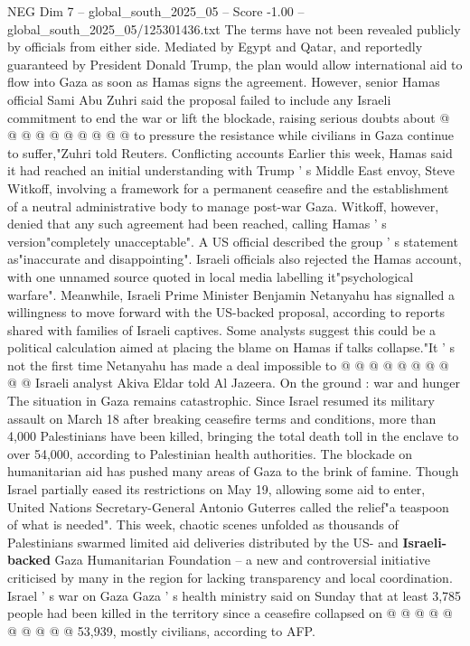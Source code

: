 \begin{textsample}{NEG Dim 7 – global\_south\_2025\_05 – Score -1.00 – global\_south\_2025\_05/125301436.txt}
The terms have not been revealed publicly by officials from either side.
Mediated by Egypt and Qatar, and reportedly guaranteed by President Donald Trump, the plan would allow international aid to flow into Gaza as soon as Hamas signs the agreement.
However, senior Hamas official Sami Abu Zuhri said the proposal failed to include any Israeli commitment to end the war or lift the blockade, raising serious doubts about @ @ @ @ @ @ @ @ @ @ to pressure the resistance while civilians in Gaza continue to suffer,"Zuhri told Reuters.
Conflicting accounts Earlier this week, Hamas said it had reached an initial understanding with Trump ' s Middle East envoy, Steve Witkoff, involving a framework for a permanent ceasefire and the establishment of a neutral administrative body to manage post-war Gaza.
Witkoff, however, denied that any such agreement had been reached, calling Hamas ' s version"completely unacceptable".
A US official described the group ' s statement as"inaccurate and disappointing".
Israeli officials also rejected the Hamas account, with one unnamed source quoted in local media labelling it"psychological warfare".
Meanwhile, Israeli Prime Minister Benjamin Netanyahu has signalled a willingness to move forward with the US-backed proposal, according to reports shared with families of Israeli captives.
Some analysts suggest this could be a political calculation aimed at placing the blame on Hamas if talks collapse."It ' s not the first time Netanyahu has made a deal impossible to @ @ @ @ @ @ @ @ @ @ Israeli analyst Akiva Eldar told Al Jazeera.
On the ground : war and hunger The situation in Gaza remains catastrophic.
Since Israel resumed its military assault on March 18 after breaking ceasefire terms and conditions, more than 4,000 Palestinians have been killed, bringing the total death toll in the enclave to over 54,000, according to Palestinian health authorities.
The blockade on humanitarian aid has pushed many areas of Gaza to the brink of famine.
Though Israel partially eased its restrictions on May 19, allowing some aid to enter, United Nations Secretary-General Antonio Guterres called the relief"a teaspoon of what is needed".
This week, chaotic scenes unfolded as thousands of Palestinians swarmed limited aid deliveries distributed by the US- and \textbf{Israeli-backed} Gaza Humanitarian Foundation -- a new and controversial initiative criticised by many in the region for lacking transparency and local coordination.
Israel ' s war on Gaza Gaza ' s health ministry said on Sunday that at least 3,785 people had been killed in the territory since a ceasefire collapsed on @ @ @ @ @ @ @ @ @ @ 53,939, mostly civilians, according to AFP.

\end{textsample}
